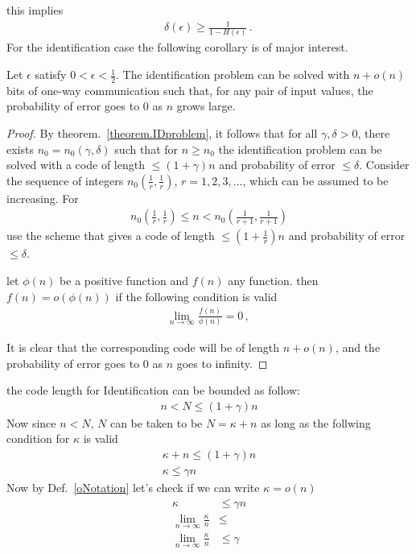 this implies 
\begin{align}
    \delta(\epsilon) \geq \frac{1}{1-H(\epsilon)}\, .\,
\end{align}
For the identification case the following corollary is of major interest. 
\begin{corollary}
Let $\epsilon$ satisfy $0 < \epsilon <\frac{1}{2}$. The identification problem can be solved with $n + o(n)$ bits of one-way communication such that, for any pair of input values, the probability of error goes to $0$ as $n$ grows large.
\end{corollary}
\begin{proof}
By theorem.~\ref{theorem.IDproblem}, it follows that for all $\gamma,\delta>0$, there exists $n_0 =n_0(\gamma,\delta)$ such that for $n\geq n_0$ the identification problem can be solved with a code of length $\leq (1+\gamma)n$ and probability of error $\leq \delta$.
Consider the sequence of integers $n_0(\frac{1}{r},\frac{1}{r})$, $r =
1,2,3,...$, which can be assumed to be increasing. For %
\begin{align}
    n_0(\frac{1}{r},\frac{1}{r}) \leq n < n_0(\frac{1}{r+1},\frac{1}{r+1})
\end{align}
use the scheme that gives a code of length $\leq (1 + \frac{1}{r})n$
and probability of error $\leq \delta$. 
\begin{definition}
\label{oNotation}
let $\phi(n)$ be a positive function and $f(n)$ any function. then $f(n)=o(\phi(n))$ if the following condition is valid
\begin{align}
    \lim_{n \to \infty} \frac{f(n)}{\phi(n)} = 0 \,,\,
\end{align}
\end{definition}
It is clear that the corresponding code will be of length $n + o(n)$, and the probability of error goes to $0$ as $n$ goes to infinity.
\end{proof}
the code length for Identification can be bounded as follow:
\begin{align}
    n< N \leq (1+\gamma)n
\end{align}
Now since $n<N$, $N$ can be taken to be $N=\kappa+n$ as long as the follwing condition for $\kappa$ is valid
\begin{align}
    \kappa+n \leq (1+\gamma)n
    \nonumber\\
    \kappa \leq \gamma n
\end{align}
Now by Def.~\ref{oNotation} let's check if we can write $\kappa=o(n)$
\begin{align}
\kappa &\leq \gamma n
\nonumber\\
\lim_{n \to \infty}  \frac{\kappa}{n} &\leq %
\nonumber\\
\lim_{n \to \infty}  \frac{\kappa}{n} &\leq \gamma
\end{align}
